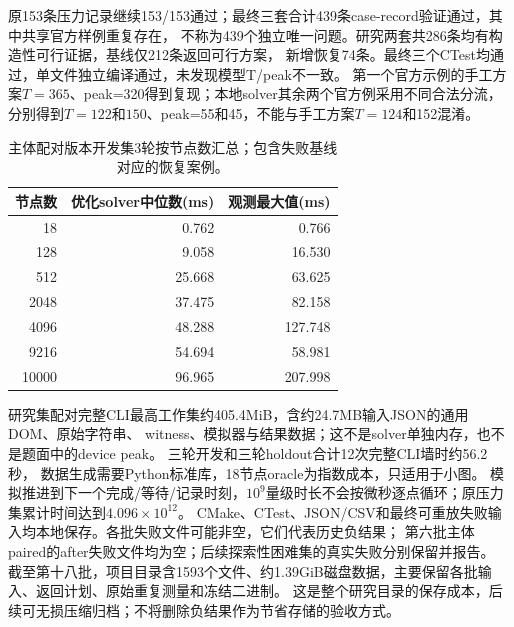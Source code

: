 \documentclass[UTF8,a4paper,11pt,fontset=fandol]{ctexart}
\begin{document}
原153条压力记录继续153/153通过；最终三套合计439条case-record验证通过，其中共享官方样例重复存在，
不称为439个独立唯一问题。研究两套共286条均有构造性可行证据，基线仅212条返回可行方案，
新增恢复74条。最终三个CTest均通过，单文件独立编译通过，未发现模型T/peak不一致。
第一个官方示例的手工方案$T=365$、peak=320得到复现；本地solver其余两个官方例采用不同合法分流，
分别得到$T=122$和$150$、peak=55和45，不能与手工方案$T=124$和152混淆。

\begin{table}[ht]
\centering\small
\begin{tabular}{rrr}
\toprule
节点数 & 优化solver中位数(ms) & 观测最大值(ms)\\
\midrule
18 & 0.762 & 0.766\\
128 & 9.058 & 16.530\\
512 & 25.668 & 63.625\\
2048 & 37.475 & 82.158\\
4096 & 48.288 & 127.748\\
9216 & 54.694 & 58.981\\
10000 & 96.965 & 207.998\\
\bottomrule
\end{tabular}
\caption{主体配对版本开发集3轮按节点数汇总；包含失败基线对应的恢复案例。}
\end{table}

研究集配对完整CLI最高工作集约405.4MiB，含约24.7MB输入JSON的通用DOM、原始字符串、
witness、模拟器与结果数据；这不是solver单独内存，也不是题面中的device peak。
三轮开发和三轮holdout合计12次完整CLI墙时约56.2秒，
数据生成需要Python标准库，18节点oracle为指数成本，只适用于小图。
模拟推进到下一个完成/等待/记录时刻，$10^9$量级时长不会按微秒逐点循环；原压力集累计时间达到$4.096\times10^{12}$。
CMake、CTest、JSON/CSV和最终可重放失败输入均本地保存。各批失败文件可能非空，它们代表历史负结果；
第六批主体paired的after失败文件均为空；后续探索性困难集的真实失败分别保留并报告。
截至第十八批，项目目录含1593个文件、约1.39GiB磁盘数据，主要保留各批输入、返回计划、原始重复测量和冻结二进制。
这是整个研究目录的保存成本，后续可无损压缩归档；不将删除负结果作为节省存储的验收方式。
\end{document}

